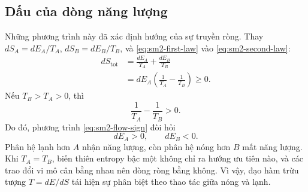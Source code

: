 \subsection{Dấu của dòng năng lượng}

Những phương trình này đã xác định hướng của sự truyền ròng. Thay \(dS_A=dE_A/T_A\), \(dS_B=dE_B/T_B\), và
\eqref{eq:sm2-first-law} vào \eqref{eq:sm2-second-law}:
\begin{align}
 dS_{\mathrm{tot}}
 &=\frac{dE_A}{T_A}+\frac{dE_B}{T_B}\\
 &=dE_A\left(\frac{1}{T_A}-\frac{1}{T_B}\right)\geq0.
 \label{eq:sm2-flow-sign}
\end{align}
Nếu \(T_B>T_A>0\), thì
\[
 \frac{1}{T_A}-\frac{1}{T_B}>0.
\]
Do đó, phương trình \eqref{eq:sm2-flow-sign} đòi hỏi
\[
 dE_A>0,
 \qquad
 dE_B<0.
\]
Phân hệ lạnh hơn \(A\) nhận năng lượng, còn phân hệ nóng hơn \(B\) mất năng lượng.
Khi \(T_A=T_B\), biến thiên entropy bậc một không chỉ ra hướng ưu tiên nào, và các trao đổi vi mô cân bằng nhau nên dòng ròng bằng không. Vì vậy, đạo hàm trừu tượng \(T=dE/dS\) tái hiện sự phân biệt theo thao tác giữa nóng và lạnh.
